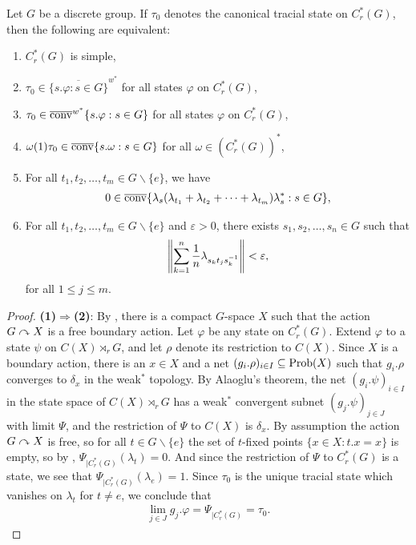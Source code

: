 \begin{theorem}\label{c*simple chp 4}
Let $G$ be a discrete group. If $\tau_0$ denotes the canonical tracial state on $C_r^*(G)$, then the following are equivalent:
\begin{enumerate}
\item $C_r^*(G)$ is simple,
\item $\tau_0 \in \overline{\{ s. \varphi : s \in G\}}^{w^*}$ for all states $\varphi$ on $C_r^*(G)$,
\item $\tau_0 \in \overline{\operatorname{conv}}^{w^*}\{s.\varphi : s \in G\}$ for all states $\varphi$ on $C_r^*(G)$,
\item $\omega(1) \tau_0 \in \overline{\operatorname{conv}}\{s.\omega : s \in G\}$ for all $\omega \in \left(C_r^*(G)\right)^*$,
\item For all $t_1,t_2,\dots,t_m \in G \backslash \{e\}$, we have
\begin{align*}
0 \in \overline{\operatorname{conv}} \{ \lambda_s ( \lambda_{t_1}+\lambda_{t_2}+\cdots+\lambda_{t_m}) \lambda_s^* : s \in G\},
\end{align*}
\item For all $t_1,t_2,\dots,t_m \in G \backslash \{e\}$ and $\varepsilon>0$, there exists $s_1, s_2 , \dots , s_n \in G$ such that
\begin{align*}
\left\lVert \sum_{k = 1 }^n \frac{1}{n} \lambda_{s_k t_j s_k^{-1}} \right\rVert < \varepsilon,
\end{align*}
for all $1 \leq j \leq m$.
\end{enumerate}
\begin{proof}
\textbf{(1)$\Rightarrow$(2)}:  By , there is a compact $G$-space $X$ such that the action $G \curvearrowright X$ is a free boundary action. Let $\varphi$ be any state on $C_r^*(G)$. Extend $\varphi$ to a state $\psi$ on $C(X) \rtimes_r G$, and let $\rho$ denote its restriction to $C(X)$. Since $X$ is a boundary action, there is an $x \in X$ and a net $(g_{i}. \rho)_{i \in I} \subseteq \operatorname{Prob}(X)$ such that $g_i . \rho $ converges to $\delta_x$ in the weak$^*$ topology. By Alaoglu's theorem, the net $(g_i . \psi)_{i \in I}$ in the state space of $C(X) \rtimes_{r} G$ has a weak$^*$ convergent subnet $(g_{j}.\psi)_{j \in J}$ with limit $\Psi$, and the restriction of $\Psi$ to $C(X)$ is $\delta_x$. By assumption the action $G \curvearrowright X$ is free, so for all $t \in G\backslash \{e\}$ the set of $t$-fixed points $\{x \in X : t.x = x \}$ is empty, so by , $\Psi_{|C_r^*(G)}(\lambda_t)=0$. And since the restriction of $\Psi$ to $C_r^*(G)$ is a state, we see that $\Psi_{|C_r^*(G)}(\lambda_e)=1$. Since $\tau_0$ is the unique tracial state which vanishes on $\lambda_t$ for $t \neq e$, we conclude that
\begin{align*}
\lim_{j \in J} g_j.\varphi =\Psi_{|C_r^*(G)}=\tau_0.
\end{align*}


\end{proof}
\end{theorem}
